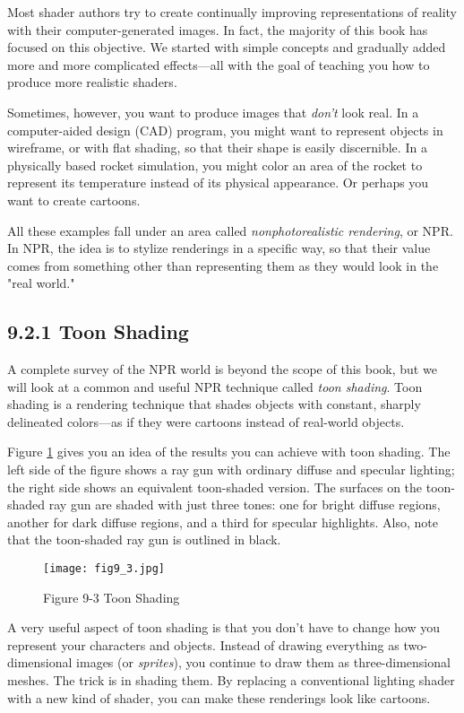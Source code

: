 \documentclass[../main.tex]{subfiles}
\begin{document}
Most shader authors try to create continually improving representations of reality with their computer-generated images. In fact, the majority of this book has focused on this objective. We started with simple concepts and gradually added more and more complicated effects—all with the goal of teaching you how to produce more realistic shaders.

Sometimes, however, you want to produce images that \textit{don't} look real. In a computer-aided design (CAD) program, you might want to represent objects in wireframe, or with flat shading, so that their shape is easily discernible. In a physically based rocket simulation, you might color an area of the rocket to represent its temperature instead of its physical appearance. Or perhaps you want to create cartoons.

All these examples fall under an area called \textit{nonphotorealistic rendering}, or NPR. In NPR, the idea is to stylize renderings in a specific way, so that their value comes from something other than representing them as they would look in the "real world."

\subsection{9.2.1 Toon Shading}

A complete survey of the NPR world is beyond the scope of this book, but we will look at a common and useful NPR technique called \textit{toon shading}. Toon shading is a rendering technique that shades objects with constant, sharply delineated colors—as if they were cartoons instead of real-world objects.

Figure \ref{fig:9-3} gives you an idea of the results you can achieve with toon shading. The left side of the figure shows a ray gun with ordinary diffuse and specular lighting; the right side shows an equivalent toon-shaded version. The surfaces on the toon-shaded ray gun are shaded with just three tones: one for bright diffuse regions, another for dark diffuse regions, and a third for specular highlights. Also, note that the toon-shaded ray gun is outlined in black.

\begin{figure}
    \centering
    \texttt{[image: fig9\_3.jpg]}
    \caption{Figure 9-3 Toon Shading}
    \label{fig:9-3}
\end{figure}

A very useful aspect of toon shading is that you don't have to change how you represent your characters and objects. Instead of drawing everything as two-dimensional images (or \textit{sprites}), you continue to draw them as three-dimensional meshes. The trick is in shading them. By replacing a conventional lighting shader with a new kind of shader, you can make these renderings look like cartoons.
\end{document}
